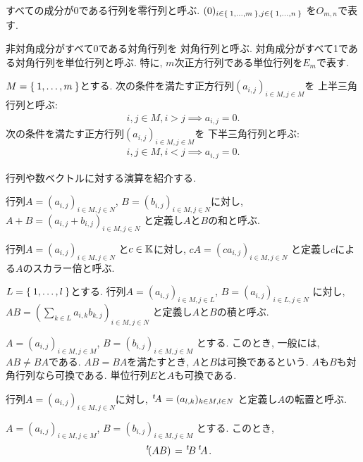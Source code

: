 すべての成分が$0$である行列を零行列と呼ぶ.
$(0)_{i\in \Set{1,\ldots,m}, j\in \Set{1,\ldots,n}}$
を$O_{m,n}$で表す.

非対角成分がすべて0である対角行列を
対角行列と呼ぶ.
対角成分がすべて1である対角行列を単位行列と呼ぶ.
特に, $m$次正方行列である単位行列を$E_m$で表す.


\begin{definition}
$M=\Set{1,\ldots,m}$とする.
次の条件を満たす正方行列$(a_{i,j})_{i\in M, j\in M}$を
上半三角行列と呼ぶ:
\begin{align*}
i,j\in M, i>j \implies a_{i,j}=0.
\end{align*}
次の条件を満たす正方行列$(a_{i,j})_{i\in M, j\in M}$を
下半三角行列と呼ぶ:
\begin{align*}
i,j\in M, i<j \implies a_{i,j}=0.
\end{align*}
\end{definition}


行列や数ベクトルに対する演算を紹介する.
\begin{definition}
行列$A=(a_{i,j})_{i\in M, j\in N}$,
$B=(b_{i,j})_{i\in M, j\in N}$に対し,
$A+B=(a_{i,j}+b_{i,j})_{i\in M, j\in N}$
と定義し$A$と$B$の和と呼ぶ.
\end{definition}
\begin{definition}
行列$A=(a_{i,j})_{i\in M, j\in N}$
と$c\in \mathbb{K}$に対し,
$cA=(ca_{i,j})_{i\in M, j\in N}$
と定義し$c$による$A$のスカラー倍と呼ぶ.
\end{definition}
\begin{definition}
$L=\Set{1,\ldots,l}$とする.
行列$A=(a_{i,j})_{i\in M, j\in L}$,
$B=(a_{i,j})_{i\in L, j\in N}$
に対し,
$AB=(\sum_{k\in L}a_{i,k}b_{k,j})_{i\in M, j\in N}$
と定義し$A$と$B$の積と呼ぶ.
\end{definition}
\begin{remark}
$A=(a_{i,j})_{i\in M, j\in M}$,
$B=(b_{i,j})_{i\in M, j\in M}$
とする.
このとき,
一般には,
$AB\neq BA$である.
$AB=BA$を満たすとき,
$A$と$B$は可換であるという.
$A$も$B$も対角行列なら可換である.
単位行列$E$と$A$も可換である.
\end{remark}

\begin{definition}
行列$A=(a_{i,j})_{i\in M, j\in N}$に対し,
${\left.^{t}\!A\right.}=(a_{l,k})_{k\in M, l\in N}$
と定義し$A$の転置と呼ぶ.
\end{definition}
\begin{prop}
$A=(a_{i,j})_{i\in M, j\in M}$,
$B=(b_{i,j})_{i\in M, j\in M}$
とする.
このとき,
\begin{align*}
{\left.^{t}\!(AB)\right.}&={\left.^{t}\!B\right.}{\left.^{t}\!A\right.}.
\end{align*}
\end{prop}
